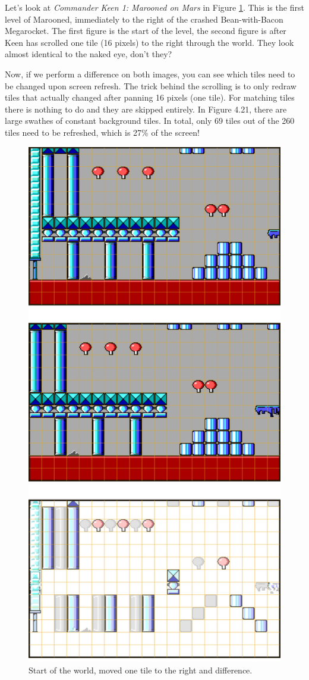 \documentclass[book.tex]{subfiles}
\begin{document}
\par
Let's look at \textit{Commander Keen 1: Marooned on Mars} in Figure \ref{fig:keen_difference}. This is the first level of Marooned, immediately to the right of the crashed Bean-with-Bacon Megarocket. The first figure is the start of the level, the second figure is after Keen has scrolled one tile (16 pixels) to the right through the world. They look almost identical to the naked eye, don't they? \\

\par
Now, if we perform a difference on both images, you can see which tiles need to be changed upon screen refresh. The trick behind the scrolling is to only redraw tiles that actually changed after panning 16 pixels (one tile). For matching tiles there is nothing to do and they are skipped entirely. In Figure 4.21, there are large swathes of constant background tiles. In total, only 69 tiles out of the 260 tiles need to be refreshed, which is 27\% of the screen!





\pagebreak
\begin{figure}[H] 
  \centering 
  \includegraphics[width=.66\textwidth]{screenshots_300dpi/game/keen-ATR-diff.png}
  \caption{Start of the world, moved one tile to the right and difference.}
  \label{fig:keen_difference}
\end{figure}
\pagebreak
\end{document}
